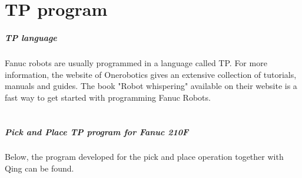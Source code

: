 \chapter{TP program} \label{TPprogram210F}

\paragraph{TP language}Fanuc robots are usually programmed in a language called TP. For more information, the website of Onerobotics \cite{OneRobotics} gives an extensive collection of tutorials, manuals and guides. The book "Robot whispering" \cite{RobotWhispering} available on their website is a fast way to get started with programming Fanuc Robots.\\
\\
\paragraph{Pick and Place TP program for Fanuc 210F}
Below, the program developed for the pick and place operation together with Qing can be found.

